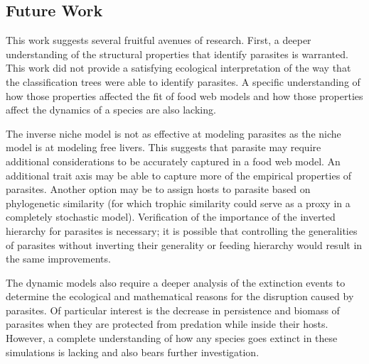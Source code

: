 \documentclass[../dissertation.tex]{subfiles}
\begin{document}
\begin{bibunit}
\section{Future Work}

This work suggests several fruitful avenues of research. First, a deeper
understanding of the structural properties that identify parasites is
warranted. This work did not provide a satisfying ecological interpretation of
the way that the classification trees were able to identify parasites. A
specific understanding of how those properties affected the fit of food web
models and how those properties affect the dynamics of a species are also
lacking.

The inverse niche model is not as effective at modeling parasites as the niche
model is at modeling free livers. This suggests that parasite may require
additional considerations to be accurately captured in a food web model. An
additional trait axis may be able to capture more of the empirical properties
of parasites. Another option may be to assign hosts to parasite based on
phylogenetic similarity (for which trophic similarity could serve as a proxy in
a completely stochastic model). Verification of the importance of the inverted
hierarchy for parasites is necessary; it is possible that controlling the
generalities of parasites without inverting their generality or feeding
hierarchy would result in the same improvements.

The dynamic models also require a deeper analysis of the extinction events to
determine the ecological and mathematical reasons for the disruption caused by
parasites. Of particular interest is the decrease in persistence and biomass
of parasites when they are protected from predation while inside their hosts.
However, a complete understanding of how any species goes extinct in these
simulations is lacking and also bears further investigation. 

\end{bibunit}
\end{document}
